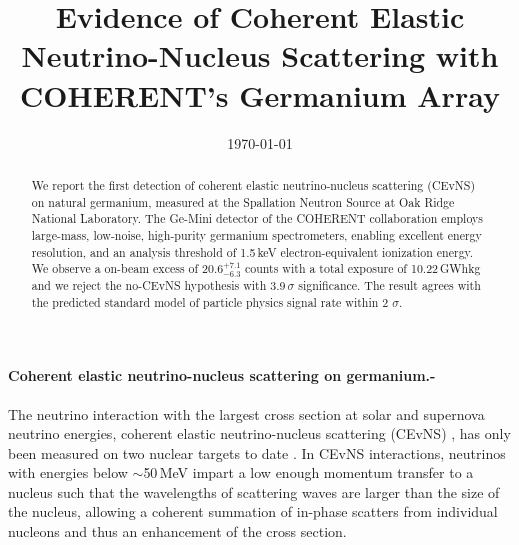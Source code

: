 \documentclass[aps,prltightenlines,superscriptaddress,nofootinbib,amsmath,amssymb,reprint]{revtex4-2}
\newcommand{\detailtexcount}[1]{%
  \immediate\write18{texcount -merge -sum -q #1.tex output.bbl > #1.wcdetail }%
}
\begin{document}

\title[Sample title]{Evidence of Coherent Elastic Neutrino-Nucleus Scattering with COHERENT’s Germanium Array}%
 
 
 

\date{\today}%

\begin{abstract}
We report the first detection of coherent elastic neutrino-nucleus scattering (CEvNS) on natural germanium, measured at the Spallation Neutron Source at Oak Ridge National Laboratory. The Ge-Mini detector of the COHERENT collaboration employs large-mass, low-noise, high-purity germanium spectrometers, enabling excellent energy resolution, and an analysis threshold of 1.5\,keV electron-equivalent ionization energy. We observe a on-beam excess of 20.6$^{+7.1}_{-6.3}$ counts with a total exposure of 10.22\,GWhkg and we reject the no-CEvNS hypothesis with 3.9\,$\sigma$ significance. The result agrees with the predicted standard model of particle physics signal rate within 2 $\sigma$.
%
\end{abstract}

\maketitle
\paragraph*{Coherent elastic neutrino-nucleus scattering on germanium.-}

The neutrino interaction with the largest cross section at solar and supernova neutrino energies, coherent elastic neutrino-nucleus scattering (CEvNS) \cite{Freedman:1973yd,akimov2017observation}, has only been measured on two nuclear targets to date \cite{akimov2017observation, akimov2022measurement, akimov2021first}.  
In CEvNS interactions, neutrinos with energies below $\sim$50\,MeV impart a low enough momentum transfer to a nucleus such that the wavelengths of scattering waves are larger than the size of the nucleus, allowing a coherent summation of in-phase scatters from individual nucleons and thus an enhancement of the cross section.
\end{document}
